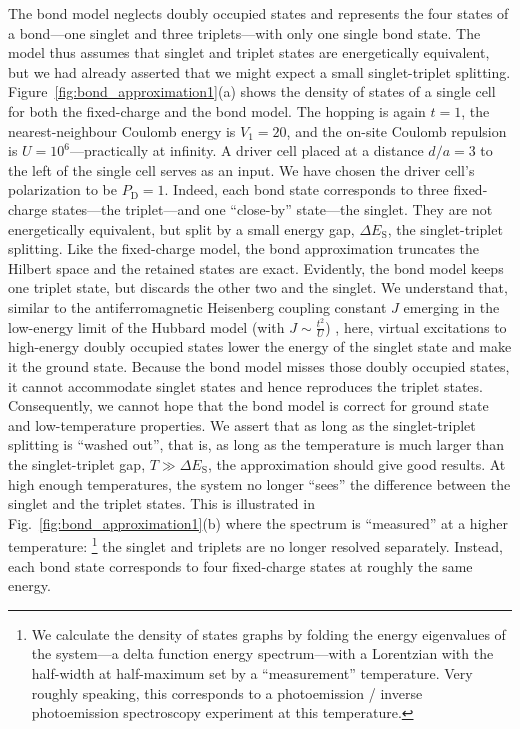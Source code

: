 The bond model neglects doubly occupied states and represents the four states of
a bond---one singlet and three triplets---with only one single bond state. The
model thus assumes that singlet and triplet states are energetically equivalent,
but we had already asserted that we might expect a small singlet-triplet
splitting. Figure~\ref{fig:bond_approximation1}(a) shows the density of states
of a single  cell for both the fixed-charge and the bond model. The
hopping is again $t=1$, the nearest-neighbour Coulomb energy is $V_1 = 20$, and
the on-site Coulomb repulsion is $U = 10^6$---practically at infinity. A driver
cell placed at a distance $d/a = 3$ to the left of the single cell serves as an
input. We have chosen the driver cell's polarization to be $P_\text{D} = 1$. Indeed,
each bond state corresponds to three fixed-charge states---the triplet---and one
``close-by'' state---the singlet. They are not energetically equivalent, but
split by a small energy gap, $\Delta E_\text{S}$, the singlet-triplet splitting. Like
the fixed-charge model, the bond approximation truncates the Hilbert space and
the retained states are exact. Evidently, the bond model keeps one triplet
state, but discards the other two and the singlet. We understand that, similar to
the antiferromagnetic Heisenberg coupling constant $J$ emerging in the
low-energy limit of the Hubbard model (with $J \sim \frac{t^2}{U}$)
\cite{Auerbach}, here, virtual excitations to high-energy doubly occupied states
lower the energy of the singlet state and make it the ground state. Because the
bond model misses those doubly occupied states, it cannot accommodate singlet
states and hence reproduces the triplet states. Consequently, we cannot hope
that the bond model is correct for ground state and low-temperature properties.
We assert that as long as the singlet-triplet splitting is ``washed out'', that
is, as long as the temperature is much larger than the singlet-triplet gap, $T
\gg \Delta E_\text{S}$, the approximation should give good results. At high enough
temperatures, the system no longer ``sees'' the difference between the singlet
and the triplet states. This is illustrated in
Fig.~\ref{fig:bond_approximation1}(b) where the spectrum is ``measured'' at a
higher temperature:%
%
\footnote{
We calculate the density of states graphs by folding the energy
eigenvalues of the system---a delta function energy spectrum---with a Lorentzian
with the half-width at half-maximum set by a ``measurement'' temperature. Very
roughly speaking, this corresponds to a photoemission / inverse photoemission
spectroscopy experiment at this temperature.
}
%
the singlet and triplets are no longer resolved separately. Instead, each bond
state corresponds to four fixed-charge states at roughly the same energy.

